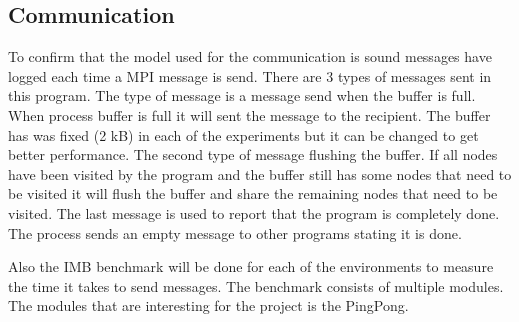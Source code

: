     
\subsection{Communication}
\label{med:comm}
To confirm that the model used for the communication is sound messages have logged each time a MPI message is send. There are 3 types of messages sent in this program. The type of message is a message send when the buffer is full. When process buffer is full it will sent the message to the recipient. The buffer has was fixed (2 kB) in each of the experiments but it can be changed to get better performance. The second type of message flushing the buffer. If all nodes have been visited by the program and the buffer still has some nodes that need to be visited it will flush the buffer and share the remaining nodes that need to be visited. The last message is used to report that the program is completely done. The process sends an empty message to other programs stating it is done.

Also the IMB benchmark will be done for each of the environments to measure the time it takes to send messages. The benchmark consists of multiple modules. The modules that are interesting for the project is the PingPong. 

